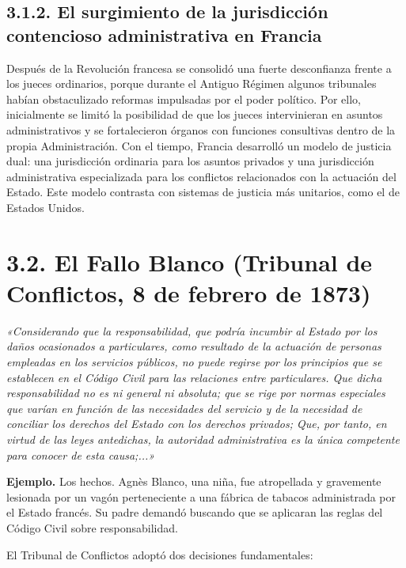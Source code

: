 \subsection{3.1.2. El surgimiento de la jurisdicción contencioso administrativa en Francia}
Después de la Revolución francesa se consolidó una fuerte desconfianza frente a los jueces ordinarios, porque durante el Antiguo Régimen algunos tribunales habían obstaculizado reformas impulsadas por el poder político. Por ello, inicialmente se limitó la posibilidad de que los jueces intervinieran en asuntos administrativos y se fortalecieron órganos con funciones consultivas dentro de la propia Administración. Con el tiempo, Francia desarrolló un modelo de justicia dual: una jurisdicción ordinaria para los asuntos privados y una jurisdicción administrativa especializada para los conflictos relacionados con la actuación del Estado. Este modelo contrasta con sistemas de justicia más unitarios, como el de Estados Unidos.

\section{3.2. El Fallo Blanco (Tribunal de Conflictos, 8 de febrero de 1873)}
\begin{cita}
\textit{«Considerando que la responsabilidad, que podría incumbir al Estado por los daños ocasionados a particulares, como resultado de la actuación de personas empleadas en los servicios públicos, no puede regirse por los principios que se establecen en el Código Civil para las relaciones entre particulares. Que dicha responsabilidad no es ni general ni absoluta; que se rige por normas especiales que varían en función de las necesidades del servicio y de la necesidad de conciliar los derechos del Estado con los derechos privados; Que, por tanto, en virtud de las leyes antedichas, la autoridad administrativa es la única competente para conocer de esta causa;...»}
\end{cita}
\begin{ejemplo}
\textcolor[HTML]{4F6228}{\textbf{Ejemplo. }}Los hechos. Agnès Blanco, una niña, fue atropellada y gravemente lesionada por un vagón perteneciente a una fábrica de tabacos administrada por el Estado francés. Su padre demandó buscando que se aplicaran las reglas del Código Civil sobre responsabilidad.
\end{ejemplo}
El Tribunal de Conflictos adoptó dos decisiones fundamentales:

